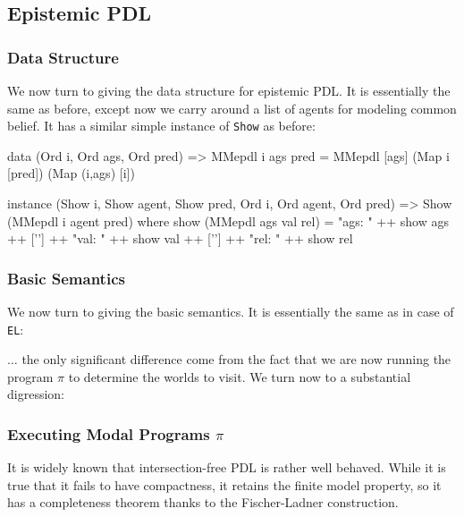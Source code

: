 \documentclass[11pt]{article}
\theoremstyle{definition}
\begin{document}
\subsection{Epistemic PDL}
\subsubsection{Data Structure}

We now turn to giving the data structure for epistemic PDL.  It is essentially the same as before, except now we carry around a list of agents for modeling common belief.  It has a similar simple instance of \texttt{Show} as before:

\begin{code}
data (Ord i, Ord ags, Ord pred) => MMepdl i ags pred =
  MMepdl [ags] (Map i [pred]) (Map (i,ags) [i])

instance (Show i, Show agent, Show pred, Ord i, Ord agent, Ord pred) => 
  Show (MMepdl i agent pred) where
    show (MMepdl ags val rel) = 
      "ags: " ++ show ags ++ ['\n'] ++
      "val: " ++ show val ++ ['\n'] ++
      "rel: " ++ show rel
\end{code}

\subsubsection{Basic Semantics}
We now turn to giving the basic semantics.  It is essentially the same as in case of \texttt{EL}:

$\ldots$ the only significant difference come from the fact that we are now running the program $\pi$ to determine the worlds to visit.  We turn now to a substantial digression:

\subsubsection{Executing Modal Programs $\pi$}\label{comppdl}

It is widely known that intersection-free PDL is rather well behaved.  While it is true that it fails to have compactness, it retains the finite model property, so it has a completeness theorem thanks to the Fischer-Ladner construction.
\end{document}
